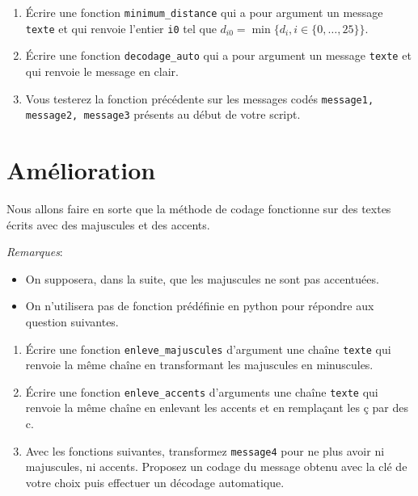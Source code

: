 \documentclass[t,11pt,eleve]{article}
\begin{document}
\begin{enumerate}
\item \'Ecrire une fonction \texttt{minimum\_distance} qui a pour argument un message \texttt{texte} et qui renvoie l'entier  \texttt{i0} tel que ${d_{i0}=\min\{d_i,i\in\{0,\dots,25\}\}}$.
\item \'Ecrire une fonction \texttt{decodage\_auto} qui a pour argument un message \texttt{texte} et qui renvoie le message en clair.
\item Vous testerez la fonction précédente sur les messages codés \texttt{message1, message2, message3} présents au début de votre script.%

\end{enumerate}

\section{Amélioration}

Nous allons faire en sorte que la méthode de codage fonctionne sur des textes écrits avec des majuscules et des accents.
\smallskip

\emph{Remarques}: 
\begin{itemize}
\item[\textbullet] On supposera, dans la suite, que les majuscules ne sont pas accentuées.
\item[\textbullet] On n'utilisera pas de fonction prédéfinie en python pour répondre aux question suivantes.
\end{itemize}
\smallskip

\begin{enumerate}
\item \'Ecrire une fonction \texttt{enleve\_majuscules} d'argument une chaîne \texttt{texte} qui renvoie la même chaîne en transformant les majuscules en minuscules.

\item \'Ecrire une fonction \texttt{enleve\_accents} d'arguments une chaîne \texttt{texte}  qui renvoie la même chaîne en enlevant les accents et en remplaçant les ç par des c.

\item Avec les fonctions suivantes, transformez \texttt{message4} pour ne plus avoir ni majuscules, ni accents. Proposez un codage du message obtenu avec la clé de votre choix puis effectuer un décodage automatique.
\end{enumerate}
\end{document}
